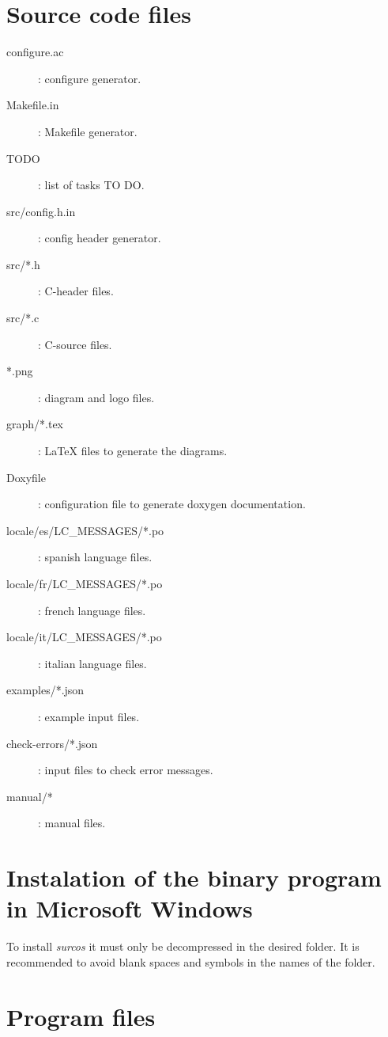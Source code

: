 \section{Source code files}

\begin{description}
\item[configure.ac]: configure generator.
\item[Makefile.in]: Makefile generator.
\item[TODO]: list of tasks TO DO.
\item[src/config.h.in]: config header generator.
\item[src/*.h]: C-header files.
\item[src/*.c]: C-source files.
\item[*.png]: diagram and logo files.
\item[graph/*.tex]: LaTeX files to generate the diagrams.
\item[Doxyfile]: configuration file to generate doxygen documentation.
\item[locale/es/LC\_MESSAGES/*.po]: spanish language files.
\item[locale/fr/LC\_MESSAGES/*.po]: french language files.
\item[locale/it/LC\_MESSAGES/*.po]: italian language files.
\item[examples/*.json]: example input files.
\item[check-errors/*.json]: input files to check error messages.
\item[manual/*]: manual files.
\end{description}

\section{Instalation of the binary program in Microsoft Windows}

To install \emph{surcos} it must only be decompressed in the desired folder.
It is recommended to avoid blank spaces and symbols in the names of the folder. 

\section{Program files}

